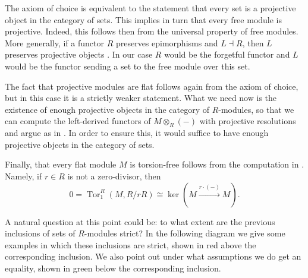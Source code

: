 \documentclass[A4paper, 12pt, british, reqno]{amsart}
\theoremstyle{plain}
\theoremstyle{definition}
\theoremstyle{remark}
\theoremstyle{plain}
\theoremstyle{definition}
\theoremstyle{remark}
\theoremstyle{plain}
\theoremstyle{definition}
\theoremstyle{remark}
\newcommand\tikzmark[1]{%
\tikz[remember picture,overlay] \node[inner xsep=0pt] (#1) {};
}
\DeclareMathOperator{\Tor}{Tor}
\newcommand{\ot}{\otimes}
\begin{document}
\begin{center}
\end{center}

The axiom of choice is equivalent to the statement that every set is a projective object in the category of sets.
This implies in turn that every free module is projective.
Indeed, this follows then from the universal property of free modules.
More generally, if a functor $R$ preserves epimorphisms and $L\dashv R$, then $L$ preserves projective objects \cite[Dual of Fact 1.1.1]{fra18}.
In our case $R$ would be the forgetful functor and $L$ would be the functor sending a set to the free module over this set.

The fact that projective modules are flat follows again from the axiom of choice, but in this case it is a strictly weaker statement.
What we need now is the existence of enough projective objects in the category of $R$-modules, so that we can compute the left-derived functors of $M\ot_{R}(-)$ with projective resolutions and argue as in \cite[Fact 1.2.1]{fra18}.
In order to ensure this, it would suffice to have enough projective objects in the category of sets.

Finally, that every flat module $M$ is torsion-free follows from the computation in \cite[Example 1.2.1]{fra18}.
Namely, if $r\in R$ is not a zero-divisor, then
\[ 0=\Tor^{R}_{1}(M,R/rR)\cong \ker(M\xrightarrow{r\cdot (-)}M). \]

A natural question at this point could be: to what extent are the previous inclusions of sets of $R$-modules strict?
In the following diagram we give some examples in which these inclusions are strict, shown in red above the corresponding inclusion.
We also point out under what assumptions we do get an equality, shown in green below the corresponding inclusion.
\end{document}
